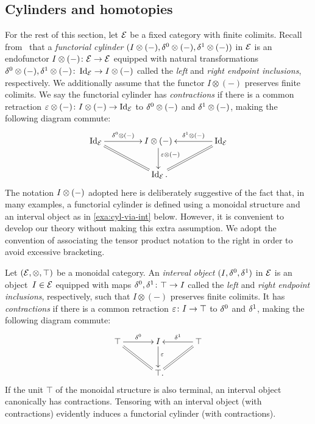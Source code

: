 \documentclass[reqno,10pt,a4paper,oneside,draft]{amsart}
\begin{document}
\subsection*{Cylinders and homotopies}

For the rest of this section, let $\mathcal{E}$ be a fixed category with finite colimits.
Recall from~\cite{kamps-porter:homotopy} that a \emph{functorial cylinder} $(I \otimes (-), \delta^0 \otimes (-), \delta^1 \otimes (-))$ in $\mathcal{E}$ is an endofunctor $I \otimes (-) \colon \mathcal{E} \to \mathcal{E}$ equipped with natural transformations $\delta^0 \otimes (-), \delta^1 \otimes (-) \colon \operatorname{Id}_{\mathcal{E}} \to I \otimes (-)$ called the \emph{left} and \emph{right endpoint inclusions}, respectively.
We additionally assume that the functor $I \otimes (-)$ preserves finite colimits.
We say the functorial cylinder has \emph{contractions} if there is a common retraction $\varepsilon \otimes (-) \colon I \otimes (-) \to \operatorname{Id}_{\mathcal{E}}$ to $\delta^0 \otimes (-)$ and $\delta^1 \otimes (-)$, making the following diagram commute:
\[
\xymatrix@C+2em{
  \Id_\catE
  \ar[r]^-{\lcyl \otimes (-)}
  \ar@{=}[dr]
&
  \interval \otimes (-)
  \ar[d]^(0.4){\ccyl \otimes (-)}
&
  \Id_\catE
  \ar[l]_-{\rcyl \otimes (-)}
  \ar@{=}[dl]
\\&
  \Id_\catE
\rlap{.}}
\]
The notation $I \otimes (-)$ adopted here is deliberately suggestive of the fact that, in many examples, a functorial cylinder is defined using a monoidal structure and an interval object as in \cref{exa:cyl-via-int} below.
However, it is convenient to develop our theory without making this extra assumption.
We adopt the convention of associating the tensor product notation to the right in order to avoid excessive bracketing.

\begin{example} \label{exa:cyl-via-int}
Let $(\mathcal{E}, \otimes, \top)$ be a monoidal category.
An \emph{interval object} $(I, \delta^0, \delta^1)$ in $\mathcal{E}$ is an object~$I \in \mathcal{E}$ equipped with maps $\delta^0, \delta^1 \colon \top \to I$ called the \emph{left} and \emph{right endpoint inclusions}, respectively, such that $I \otimes (-)$ preserves finite colimits.
It has \emph{contractions} if there is a common retraction $\varepsilon \colon I \to \top$ to $\delta^0$ and $\delta^1$, making the following diagram commute:
\[
\xymatrix@C+1em{
  \top
  \ar[r]^-{\lcyl}
  \ar@{=}[dr]
&
  \interval
  \ar[d]^(0.4){\ccyl}
&
  \top
  \ar[l]_-{\rcyl}
  \ar@{=}[dl]
\\&
  \top
\rlap{.}}
\]
If the unit $\top$ of the monoidal structure is also terminal, an interval object canonically has contractions.
Tensoring with an interval object (with contractions) evidently induces a functorial cylinder (with contractions).
\end{example}
\end{document}
